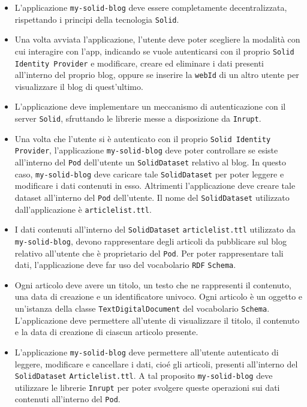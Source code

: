 \begin{itemize}
	\item L'applicazione {\tt my-solid-blog} deve essere completamente decentralizzata, rispettando i principi della tecnologia {\tt Solid}.
	\item Una volta avviata l'applicazione, l'utente deve poter scegliere la modalità con cui interagire con l'app, indicando se vuole autenticarsi con il proprio {\tt Solid Identity Provider} e modificare, creare ed eliminare i dati presenti all'interno del proprio blog, oppure se inserire la {\tt webId} di un altro utente per visualizzare il blog di quest'ultimo.
	\item L'applicazione deve implementare un meccanismo di autenticazione con il server {\tt Solid}, sfruttando le librerie messe a disposizione da {\tt Inrupt}.
	\item Una volta che l'utente si è autenticato con il proprio {\tt Solid Identity Provider}, l'applicazione {\tt my-solid-blog} deve poter controllare se esiste all'interno del {\tt Pod} dell'utente un {\tt SolidDataset} relativo al blog. In questo caso, {\tt my-solid-blog} deve caricare tale {\tt SolidDataset} per poter leggere e modificare i dati contenuti in esso. Altrimenti l'applicazione deve creare tale dataset all'interno del {\tt Pod} dell'utente. Il nome del {\tt SolidDataset} utilizzato dall'applicazione è {\tt articlelist.ttl}.
	\item I dati contenuti all'interno del {\tt SolidDataset} {\tt articlelist.ttl} utilizzato da\\ {\tt my-solid-blog}, devono rappresentare degli articoli da pubblicare sul blog\\relativo all'utente che è proprietario del {\tt Pod}. Per poter rappresentare tali dati, l'applicazione deve far uso del vocabolario {\tt RDF} {\tt Schema}.
	\item Ogni articolo deve avere un titolo, un testo che ne rappresenti il contenuto, una data di creazione e un identificatore univoco. Ogni articolo è un oggetto e un'istanza della classe {\tt TextDigitalDocument} del vocabolario {\tt Schema}. L'applicazione deve permettere all'utente di visualizzare il titolo, il contenuto e la data di creazione di ciascun articolo presente.
	\item L'applicazione {\tt my-solid-blog} deve permettere all'utente autenticato di leggere, modificare e cancellare i dati, cioé gli articoli, presenti all'interno del {\tt SolidDataset} {\tt Articlelist.ttl}. A tal proposito {\tt my-solid-blog} deve utilizzare le librerie {\tt Inrupt} per poter svolgere queste operazioni sui dati contenuti all'interno del {\tt Pod}. 

\end{itemize}
